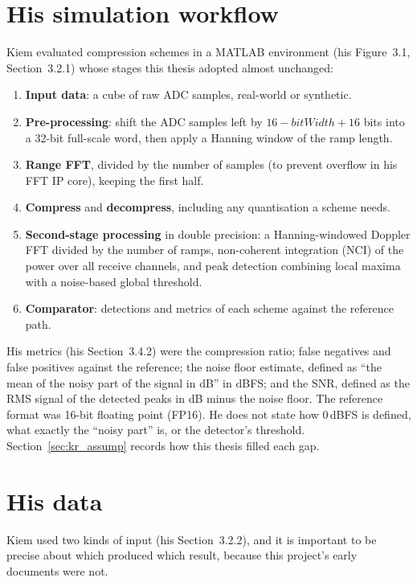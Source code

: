 \section{His simulation workflow}
\label{sec:kiem_workflow}

Kiem evaluated compression schemes in a MATLAB environment (his Figure~3.1,
Section~3.2.1) whose stages this thesis adopted almost unchanged:

\begin{enumerate}
\item \textbf{Input data}: a cube of raw ADC samples, real-world or synthetic.
\item \textbf{Pre-processing}: shift the ADC samples left by
$16 - \mathit{bitWidth} + 16$ bits into a 32-bit full-scale word, then apply a
Hanning window of the ramp length.
\item \textbf{Range FFT}, divided by the number of samples (to prevent overflow
in his FFT IP core), keeping the first half.
\item \textbf{Compress} and \textbf{decompress}, including any quantisation a
scheme needs.
\item \textbf{Second-stage processing} in double precision: a Hanning-windowed
Doppler FFT divided by the number of ramps, non-coherent integration (NCI) of
the power over all receive channels, and peak detection combining local maxima
with a noise-based global threshold.
\item \textbf{Comparator}: detections and metrics of each scheme against the
reference path.
\end{enumerate}

His metrics (his Section~3.4.2) were the compression ratio; false negatives
and false positives against the reference; the noise floor estimate, defined
as ``the mean of the noisy part of the signal in dB'' in dBFS; and the SNR,
defined as the RMS signal of the detected peaks in dB minus the noise floor.
The reference format was 16-bit floating point (FP16). He does not state how
0\,dBFS is defined, what exactly the ``noisy part'' is, or the detector's
threshold. Section~\ref{sec:kr_assump} records how this thesis filled each gap.

\section{His data}
\label{sec:kiem_data}

Kiem used two kinds of input (his Section~3.2.2), and it is important to be
precise about which produced which result, because this project's early
documents were not.


